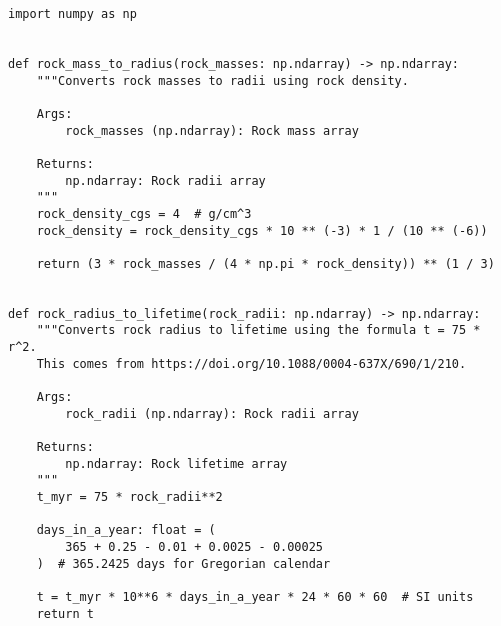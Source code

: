\begin{lstlisting}
import numpy as np


def rock_mass_to_radius(rock_masses: np.ndarray) -> np.ndarray:
    """Converts rock masses to radii using rock density.

    Args:
        rock_masses (np.ndarray): Rock mass array

    Returns:
        np.ndarray: Rock radii array
    """
    rock_density_cgs = 4  # g/cm^3
    rock_density = rock_density_cgs * 10 ** (-3) * 1 / (10 ** (-6))

    return (3 * rock_masses / (4 * np.pi * rock_density)) ** (1 / 3)


def rock_radius_to_lifetime(rock_radii: np.ndarray) -> np.ndarray:
    """Converts rock radius to lifetime using the formula t = 75 * r^2.
    This comes from https://doi.org/10.1088/0004-637X/690/1/210.

    Args:
        rock_radii (np.ndarray): Rock radii array

    Returns:
        np.ndarray: Rock lifetime array
    """
    t_myr = 75 * rock_radii**2

    days_in_a_year: float = (
        365 + 0.25 - 0.01 + 0.0025 - 0.00025
    )  # 365.2425 days for Gregorian calendar

    t = t_myr * 10**6 * days_in_a_year * 24 * 60 * 60  # SI units
    return t
\end{lstlisting}